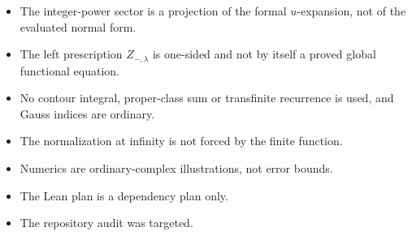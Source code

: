 \documentclass[11pt,a4paper]{article}
\numberwithin{equation}{section}
\theoremstyle{definition}
\theoremstyle{remark}
\begin{document}
\begin{itemize}
 covering-map claim.
\item The integer-power sector is a projection of the formal $u$-expansion,
 not of the evaluated normal form.
\item The left prescription $Z_{-,\lambda}$ is one-sided and not by itself a
 proved global functional equation.
\item No contour integral, proper-class sum or transfinite recurrence is
 used, and Gauss indices are ordinary.
\item The normalization at infinity is not forced by the finite function.
\item Numerics are ordinary-complex illustrations, not error bounds.
\item The Lean plan is a dependency plan only.
\item The repository audit was targeted.
\end{itemize}
\end{document}
